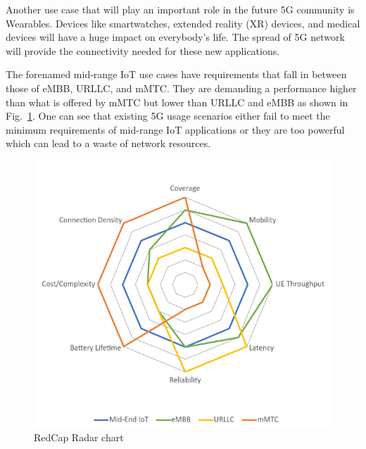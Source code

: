 \documentclass[]{IEEEtran}
\begin{document}
Another use case that will play an important role in the future 5G community is Wearables.
Devices like smartwatches, extended reality (XR) devices, and medical devices will have a huge impact on everybody's life.
The spread of 5G network will provide the connectivity needed for these new applications.

The forenamed mid-range IoT use cases have requirements that fall in between those of eMBB, URLLC, and mMTC.
They are demanding a performance higher than what is offered by mMTC but lower than URLLC and eMBB as shown in Fig.~\ref{fig:redcap-spider}.
One can see that existing 5G usage scenarios either fail to meet the minimum requirements of mid-range IoT applications or they are too powerful which can lead to a waste of network resources.

\begin{figure}
    \centering
    \includegraphics[width=\linewidth]{Pictures/Radar Chart RedCap.png}    
    \caption{RedCap Radar chart}
    \label{fig:redcap-spider}
\end{figure}
\end{document}
